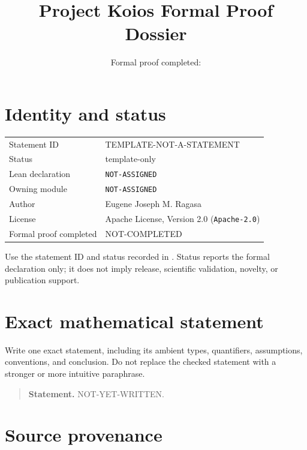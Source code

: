 \documentclass[11pt]{article}
\title{Project Koios Formal Proof Dossier\\\large \StatementID}
\author{\ProofAuthor}
\date{Formal proof completed: \ProofCompleted}
\newcommand{\StatementID}{TEMPLATE-NOT-A-STATEMENT}
\newcommand{\StatementStatus}{template-only}
\newcommand{\LeanDeclaration}{NOT-ASSIGNED}
\newcommand{\LeanModule}{NOT-ASSIGNED}
\newcommand{\ProofAuthor}{Eugene Joseph M. Ragasa}
\newcommand{\ProofCompleted}{NOT-COMPLETED}
\begin{document}
\maketitle

\begin{center}
\end{center}

\section{Identity and status}

\begin{tabularx}{\textwidth}{@{}lX@{}}
\toprule
Statement ID & \StatementID \\
Status & \StatementStatus \\
Lean declaration & \texttt{\LeanDeclaration} \\
Owning module & \texttt{\LeanModule} \\
Author & \ProofAuthor \\
License & Apache License, Version 2.0 (\texttt{Apache-2.0}) \\
Formal proof completed & \ProofCompleted \\
\bottomrule
\end{tabularx}

Use the statement ID and status recorded in . Status
reports the formal declaration only; it does not imply release, scientific validation,
novelty, or publication support.

\section{Exact mathematical statement}

Write one exact statement, including its ambient types, quantifiers, assumptions,
conventions, and conclusion. Do not replace the checked statement with a stronger or
more intuitive paraphrase.

\begin{quote}
\textbf{Statement.} NOT-YET-WRITTEN.
\end{quote}

\section{Source provenance}
\end{document}
